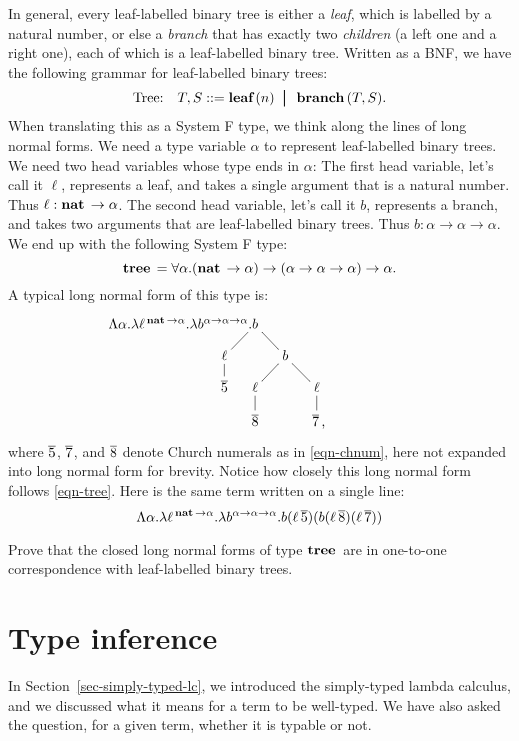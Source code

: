 \documentclass{article}
\begin{document}
In general, every leaf-labelled binary tree is either a {\em leaf},
which is labelled by a natural number, or else a {\em branch} that has
exactly two {\em children} (a left one and a right one), each of which
is a leaf-labelled binary tree. Written as a BNF, we have the
following grammar for leaf-labelled binary trees:
\[ \mbox{Tree:}\ssep T,S \bnf \leaft(n) \bor \brancht(T,S).
\]
When translating this as a System F type, we think along the lines of
long normal forms. We need a type variable $\alpha$ to represent
leaf-labelled binary trees. We need two head variables whose type ends
in $\alpha$: The first head variable, let's call it $\ell$, represents
a leaf, and takes a single argument that is a natural number. Thus
$\ell:\mathop{\textbf{\bf nat}\,}\to\alpha$. The second head variable, let's call it $b$,
represents a branch, and takes two arguments that are leaf-labelled
binary trees. Thus $b:\alpha\to\alpha\to\alpha$. We end up with the
following System F type:
\[ \mathop{\textbf{\bf tree}\,} =
\forall\alpha.(\mathop{\textbf{\bf nat}\,}\to\alpha)\to(\alpha\to\alpha\to\alpha)\to\alpha.
\]
A typical long normal form of this type is:
\[ \xymatrix@R-1.5em@C-3ex{
  &&\makebox[0in][r]{$\Lamabs{\alpha}.\lamabs{\ell}{\,\nat\to\alpha}.\lamabs{b}{\alpha\to\alpha\to\alpha}.$}b\ar@{-}[dl]\ar@{-}[dr]
  \\
  &\ell\ar@{-}[d] &&b\ar@{-}[dl]\ar@{-}[dr]
  \\
  &\chnum{5}& \ell\ar@{-}[d] && \ell\ar@{-}[d]
  \\
  && \chnum{8} && \chnum{7}\makebox[0in][l]{,}
}
\]
where $\mathop{\overline{5}}$, $\mathop{\overline{7}}$, and $\mathop{\overline{8}}$ denote Church numerals
as in {\eqref{eqn-chnum}}, here not expanded into long normal form for
brevity. Notice how closely this long normal form follows
{\eqref{eqn-tree}}. Here is the same term written on a single line:
\[ \Lambda\alpha.\lambda\ell^{\,\mathop{\textbf{\bf nat}\,}\to\alpha}.\lambda b^{\alpha\to\alpha\to\alpha}.b(\ell\mathop{\overline{5}})(b(\ell\mathop{\overline{8}})(\ell\mathop{\overline{7}}))
\]

\begin{exercise}
  Prove that the closed long normal forms of type $\mathop{\textbf{\bf tree}\,}$ are in
  one-to-one correspondence with leaf-labelled binary trees.
\end{exercise}

\section{Type inference}

In Section~\ref{sec-simply-typed-lc}, we introduced the simply-typed lambda
calculus, and we discussed what it means for a term to be well-typed.
We have also asked the question, for a given term, whether it is
typable or not.
\end{document}
